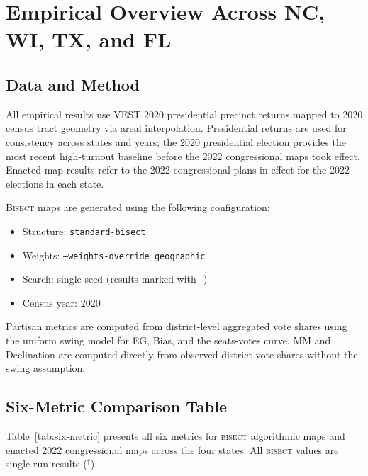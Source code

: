 \section{Empirical Overview Across NC, WI, TX, and FL}
\label{sec:empirical}

\subsection{Data and Method}

All empirical results use VEST 2020 presidential precinct returns mapped to
2020 census tract geometry via areal interpolation. Presidential returns are
used for consistency across states and years; the 2020 presidential election
provides the most recent high-turnout baseline before the 2022 congressional
maps took effect. Enacted map results refer to the 2022 congressional plans
in effect for the 2022 elections in each state.

\textsc{Bisect} maps are generated using the following configuration:
\begin{itemize}
\item Structure: \texttt{standard-bisect}
\item Weights: \texttt{--weights-override geographic}
\item Search: single seed (results marked with $^\dagger$)
\item Census year: 2020
\end{itemize}

Partisan metrics are computed from district-level aggregated vote shares using
the uniform swing model for EG, Bias, and the seats-votes curve. MM and
Declination are computed directly from observed district vote shares without
the swing assumption.

\subsection{Six-Metric Comparison Table}

Table~\ref{tab:six-metric} presents all six metrics for \textsc{bisect}
algorithmic maps and enacted 2022 congressional maps across the four states.
All \textsc{bisect} values are single-run results ($^\dagger$).

